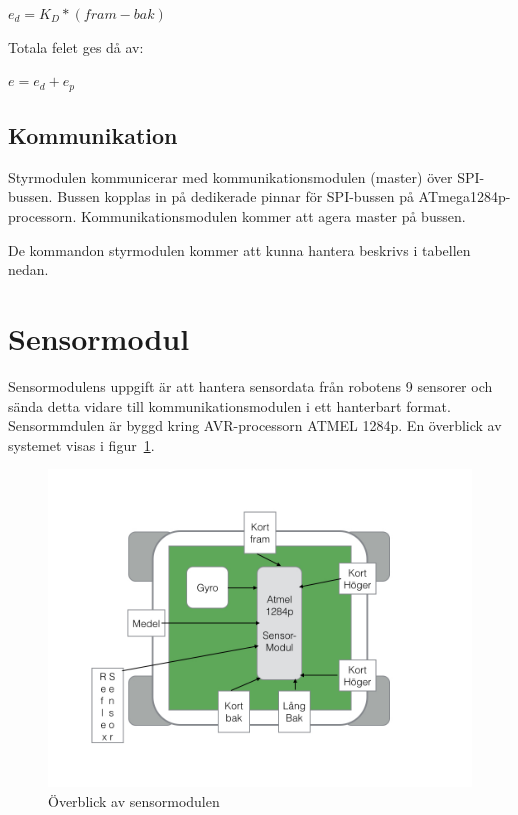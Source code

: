 \documentclass[a4paper,12pt,fleqn]{article}
\begin{document}
$ e_d = K_{D}*(fram - bak) $

Totala felet ges då av: 

$e = e_d + e_p$



\subsection{Kommunikation}

Styrmodulen kommunicerar med kommunikationsmodulen (master) över SPI-bussen. Bussen kopplas in på dedikerade pinnar för SPI-bussen på ATmega1284p-processorn. Kommunikationsmodulen kommer att agera master på bussen.

De kommandon styrmodulen kommer att kunna hantera beskrivs i tabellen nedan. \newline

\newpage



\section{Sensormodul}
Sensormodulens uppgift är att hantera sensordata från robotens 9 sensorer och sända detta vidare till kommunikationsmodulen i ett hanterbart format. Sensormmdulen är byggd kring AVR-processorn ATMEL 1284p. En överblick av systemet visas i figur~\ref{fig:sensoroverview}.

\begin{figure}[htp] %
  \begin{center}
  \includegraphics[keepaspectratio=true,width=\linewidth]{bilder/overblicksensor}  %
  \end{center}
  \caption{Överblick av sensormodulen} %
  \label{fig:sensoroverview}
\end{figure}
\end{document}
